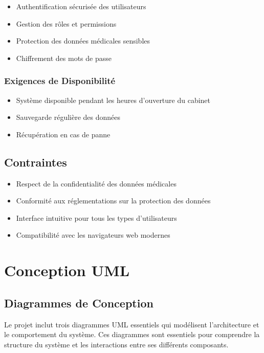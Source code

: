 \documentclass[12pt,a4paper]{report}
\begin{document}
\begin{itemize}
    \item Authentification sécurisée des utilisateurs
    \item Gestion des rôles et permissions
    \item Protection des données médicales sensibles
    \item Chiffrement des mots de passe
\end{itemize}

\subsection{Exigences de Disponibilité}

\begin{itemize}
    \item Système disponible pendant les heures d'ouverture du cabinet
    \item Sauvegarde régulière des données
    \item Récupération en cas de panne
\end{itemize}

\section{Contraintes}

\begin{itemize}
    \item Respect de la confidentialité des données médicales
    \item Conformité aux réglementations sur la protection des données
    \item Interface intuitive pour tous les types d'utilisateurs
    \item Compatibilité avec les navigateurs web modernes
\end{itemize}

\chapter{Conception UML}

\section{Diagrammes de Conception}

Le projet inclut trois diagrammes UML essentiels qui modélisent l'architecture et le comportement du système. Ces diagrammes sont essentiels pour comprendre la structure du système et les interactions entre ses différents composants.
\end{document}
